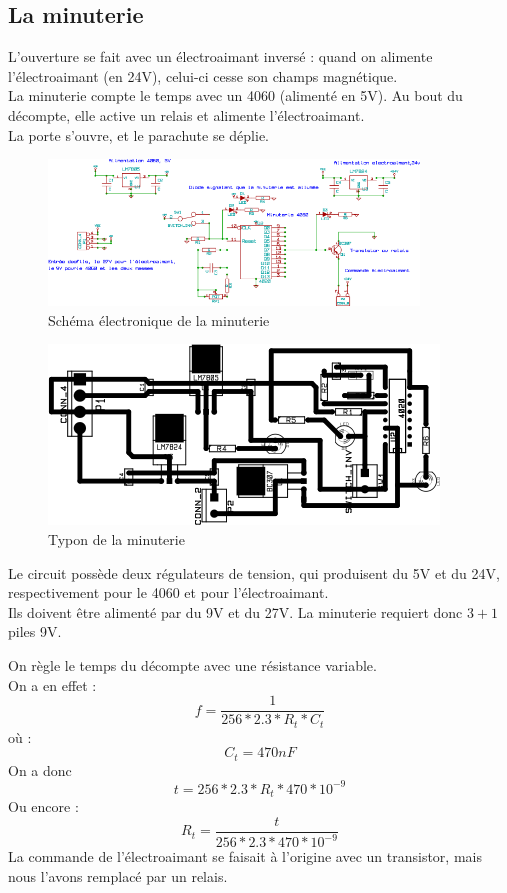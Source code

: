 \documentclass[a4paper,12pt]{scrartcl}
\begin{document}
	   \subsection{La minuterie}
		L'ouverture se fait avec un électroaimant inversé : quand on alimente l'électroaimant (en 24V), celui-ci cesse son champs magnétique.\\
		La minuterie compte le temps avec un 4060 (alimenté en 5V). Au bout du décompte, elle active un relais et alimente l'électroaimant.\\
		La porte s'ouvre, et le parachute se déplie.
	      \begin{figure}[H]
		    \begin{center}
		      \caption{ Schéma électronique de la minuterie }
		      \includegraphics[height=147px, width=372px]{Photos_Mercury/4060.png}
		    \end{center}
	      \end{figure}
	      \begin{figure}[H]
		    \begin{center}
		      \caption{ Typon de la minuterie }
		      \includegraphics[height=181px, width=392px]{Photos_Mercury/4060-brd.png}
		    \end{center}
	      \end{figure}
		   Le circuit possède deux régulateurs de tension, qui produisent du 5V et du 24V, respectivement pour le 4060 et pour l'électroaimant.\\
		   Ils doivent être alimenté par du 9V et du 27V.
		   La minuterie requiert donc $3+1$ piles 9V.
		  
		   On règle le temps du décompte avec une résistance variable.\\
		   On a en effet : 
		    $$ f = \frac{1}{256 * 2.3 * R_t*C_t}$$
		   où : 
		    $$ C_t = 470 nF$$
		   On a donc 
		    $$ t = 256 * 2.3 * R_t * 470*10^{-9} $$
		   Ou encore : 
		    $$ R_t = \frac{t}{256 * 2.3 * 470 * 10^{-9}}$$
		   La commande de l'électroaimant se faisait à l'origine avec un transistor, mais nous l'avons remplacé par un relais.
\end{document}
